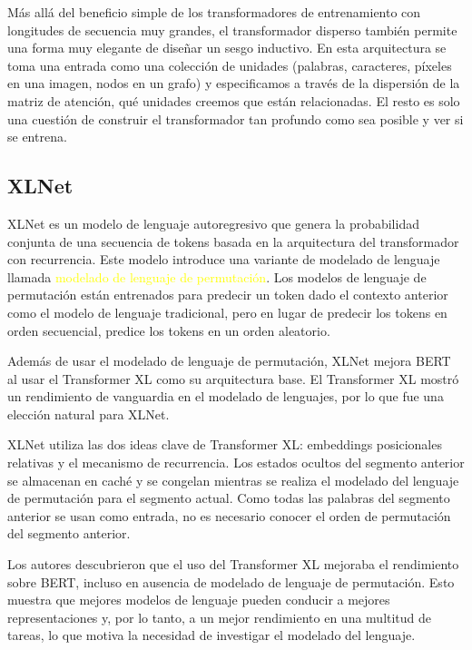 \documentclass[conference]{IEEEtran}
\begin{document}
\vspace{0.2cm}

M\'as all\'a del beneficio simple de los transformadores de entrenamiento con longitudes de secuencia muy grandes, el transformador disperso tambi\'en permite una forma muy elegante de dise\~nar un sesgo inductivo. En esta arquitectura se toma una  entrada como una colecci\'on de unidades (palabras, caracteres, p\'ixeles en una imagen, nodos en un grafo) y especificamos  a trav\'es de la dispersi\'on de la matriz de atenci\'on, qu\'e unidades creemos que est\'an relacionadas. El resto es solo una cuesti\'on de construir el transformador tan profundo como sea posible y ver si se entrena.


\subsection{XLNet}

XLNet es un modelo de lenguaje autoregresivo que genera la probabilidad conjunta de una secuencia de tokens basada en la arquitectura del transformador con recurrencia. Este modelo introduce una variante de modelado de lenguaje llamada \textcolor{yellow}{modelado de lenguaje de permutaci\'on}. Los modelos de lenguaje de permutaci\'on est\'an entrenados para predecir un token dado el contexto anterior como el modelo de lenguaje tradicional, pero en lugar de predecir los tokens en orden secuencial, predice los tokens en un orden aleatorio.

Adem\'as de usar el modelado de lenguaje de permutaci\'on, XLNet mejora BERT al usar el Transformer XL como su arquitectura base. El Transformer XL mostr\'o un rendimiento de vanguardia en el modelado de lenguajes, por lo que fue una elecci\'on natural para XLNet.

XLNet utiliza las dos ideas clave de Transformer XL: embeddings posicionales relativas y el mecanismo de recurrencia. Los estados ocultos del segmento anterior se almacenan en cach\'e y se congelan mientras se realiza el modelado del lenguaje de permutaci\'on para el segmento actual. Como todas las palabras del segmento anterior se usan como entrada, no es necesario conocer el orden de permutaci\'on del segmento anterior.

Los autores descubrieron que el uso del Transformer XL mejoraba el rendimiento sobre BERT, incluso en ausencia de modelado de lenguaje de permutaci\'on. Esto muestra que mejores modelos de lenguaje pueden conducir a mejores representaciones y, por lo tanto, a un mejor rendimiento en una multitud de tareas, lo que motiva la necesidad de investigar el modelado del lenguaje.
	
\end{document}
